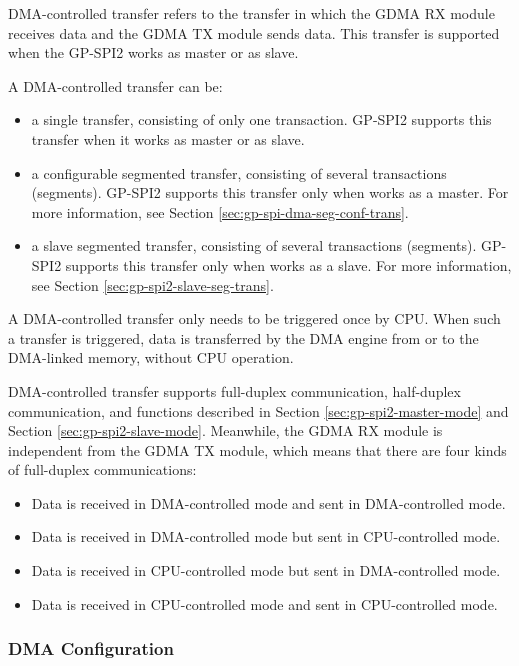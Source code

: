 \documentclass[main\_\_EN.tex]{subfiles}
\begin{document}
DMA-controlled transfer refers to the transfer in which the GDMA RX module receives data and the GDMA TX module sends data. This transfer is supported when the GP-SPI2 works as master or as slave.

A DMA-controlled transfer can be:

\begin{itemize}
    \item a single transfer, consisting of only one transaction. GP-SPI2 supports this transfer when it works as master or as slave.
    \item a configurable segmented transfer, consisting of several transactions (segments). GP-SPI2 supports this transfer only when works as a master. For more information, see Section \ref{sec:gp-spi-dma-seg-conf-trans}.
    \item a slave segmented transfer, consisting of several transactions (segments). GP-SPI2 supports this transfer only when works as a slave. For more information, see Section \ref{sec:gp-spi2-slave-seg-trans}.
\end{itemize}

A DMA-controlled transfer only needs to be triggered once by CPU. When such a transfer is triggered, data is transferred by the DMA engine from or to the DMA-linked memory, without CPU operation.

DMA-controlled transfer supports full-duplex communication, half-duplex communication, and functions described in Section \ref{sec:gp-spi2-master-mode} and Section \ref{sec:gp-spi2-slave-mode}. Meanwhile, the GDMA RX module is independent from the GDMA TX module, which means that there are four kinds of full-duplex communications:

\begin{itemize}
    \item Data is received in DMA-controlled mode and sent in DMA-controlled mode.
    \item Data is received in DMA-controlled mode but sent in CPU-controlled mode. 
    \item Data is received in CPU-controlled mode but sent in DMA-controlled mode.
    \item Data is received in CPU-controlled mode and sent in CPU-controlled mode.
\end{itemize}

\subsubsection{DMA Configuration}\label{sec:DMA-conf}
\end{document}
